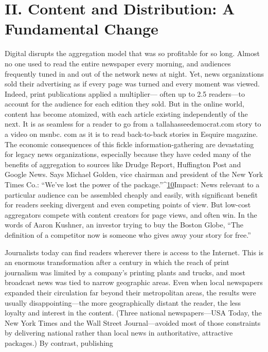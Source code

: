 \section{II. Content and Distribution: A Fundamental Change}
\item Digital disrupts the aggregation model that was so profitable for so
long. Almost no one used to read the entire newspaper every morning,
and audiences frequently tuned in and out of the network news at night.
Yet, news organizations sold their advertising as if every page was turned
and every moment was viewed. Indeed, print publications applied a multiplier—
often up to 2.5 readers—to account for the audience for each
edition they sold. But in the online world, content has become atomized,
with each article existing independently of the next. It is as seamless for a
reader to go from a tallahasseedemocrat.com story to a video on msnbc.
com as it is to read back-to-back stories in Esquire magazine. The economic
consequences of this fickle information-gathering are devastating
for legacy news organizations, especially because they have ceded many
of the benefits of aggregation to sources like Drudge Report, Huffington
Post and Google News. Says Michael Golden, vice chairman and president
of the New York Times Co.: ``We’ve lost the power of the package.''^{\href{#endnotes-ch1}{10}}Impact: News relevant to a particular audience can be assembled cheaply
and easily, with significant benefit for readers seeking divergent and even
competing points of view. But low-cost aggregators compete with content
creators for page views, and often win. In the words of Aaron Kushner, an
investor trying to buy the Boston Globe, ``The definition of a competitor
now is someone who gives away your story for free.''
\item Journalists today can find readers wherever there is access to the Internet.
This is an enormous transformation after a century in which the
reach of print journalism was limited by a company’s printing plants and
trucks, and most broadcast news was tied to narrow geographic areas. Even
when local newspapers expanded their circulation far beyond their metropolitan
areas, the results were usually disappointing—the more geographically
distant the reader, the less loyalty and interest in the content. (Three
national newspapers—USA Today, the New York Times and the Wall Street
Journal—avoided most of those constraints by delivering national rather
than local news in authoritative, attractive packages.) By contrast, publishing
